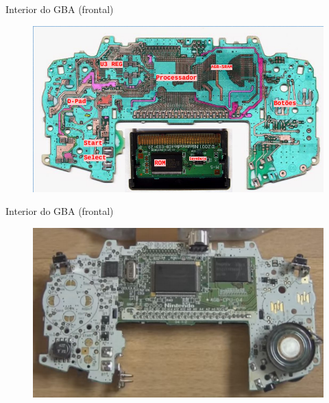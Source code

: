 \documentclass{beamer}
\begin{document}
\begin{darkframes}
\begin{frame}{Interior do GBA (frontal)}
    \begin{figure}[h!]
        \centering
        \includegraphics[width=1\textwidth,height=1\textheight,keepaspectratio]{gba_inside_front}
    \end{figure}
\end{frame}

\begin{frame}{Interior do GBA (frontal)}
    \begin{figure}[h!]
        \centering
        \includegraphics[width=1\textwidth,height=1\textheight,keepaspectratio]{gba_inside_front_real}
    \end{figure}
\end{frame}


\end{darkframes}
\end{document}
